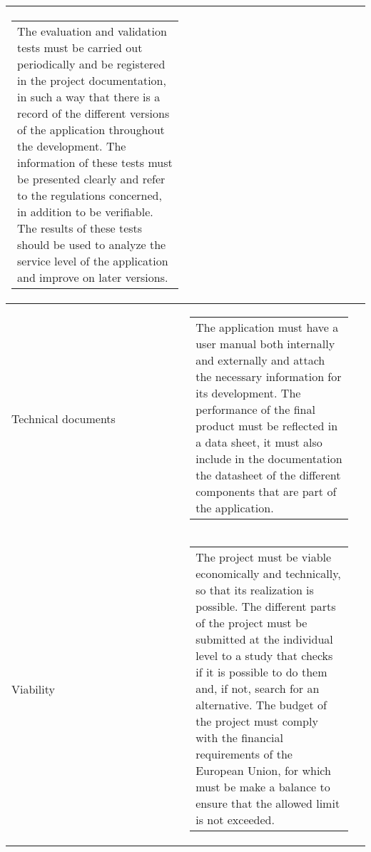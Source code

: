 \begin{longtable}[H]{l c c}
\begin{tabular}[c]{@{}l@{}}
\begin{minipage}[t]{\linewidth}
			The evaluation and validation tests must be carried out periodically and be registered in the project documentation, in such a way that there is a record of the different versions of the application throughout the development.
			The information of these tests must be presented clearly and refer to the regulations concerned, in addition to be verifiable.
			The results of these tests should be used to analyze the service level of the application and improve on later versions. \vspace{0.3cm}
	\end{minipage} \end{tabular}                                                                                                                                          \\  \midrule
	Technical documents & \begin{tabular}[c]{@{}l@{}}\begin{minipage}[t]{\linewidth}
			The application must have a user manual both internally and externally and attach the necessary information for its development.
			The performance of the final product must be reflected in a data sheet, it must also include in the documentation the datasheet of the different components that are part of the application. \vspace{0.3cm}
	\end{minipage} \end{tabular}                                                                                                                                           \\  \midrule
	Viability & \begin{tabular}[c]{@{}l@{}}\begin{minipage}[t]{\linewidth}
			The project must be viable economically and technically, so that its realization is possible.
			The different parts of the project must be submitted at the individual level to a study that checks if it is possible to do them and, if not, search for an alternative.
			The budget of the project must comply with the financial requirements of the European Union, for which must be make a balance to ensure that the allowed limit is not exceeded. \vspace{0.3cm}
	\end{minipage} \end{tabular}                                                                                                                                             \\  \midrule

\end{longtable}
